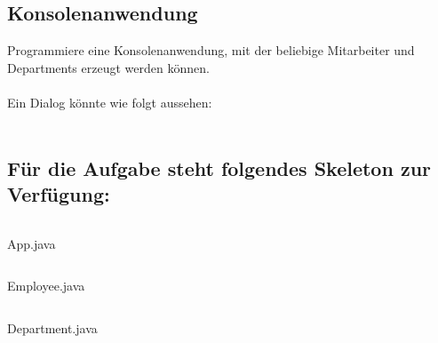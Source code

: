 \documentclass[12pt, oneside]{article}   	%
\begin{document}
\subsection{Konsolenanwendung}
Programmiere eine Konsolenanwendung, mit der beliebige Mitarbeiter und \\ Departments erzeugt werden können. \\ \\
Ein Dialog könnte wie folgt aussehen: \\ \\

\newpage
\subsection*{Für die Aufgabe steht folgendes Skeleton zur Verfügung:}

\begin{listing}[ht]
\inputminted[frame=lines, style=fruity, bgcolor=black]{Java}{App.java}
\caption{App.java}
\end{listing}
\newpage
\begin{listing}[ht]
\inputminted[frame=lines, style=fruity, bgcolor=black]{Java}{Employee.java}
\caption{Employee.java}
\end{listing}
\newpage
\begin{listing}[ht]
\inputminted[frame=lines, style=fruity, bgcolor=black]{Java}{Department.java}
\caption{Department.java}
\end{listing}
\end{document}
